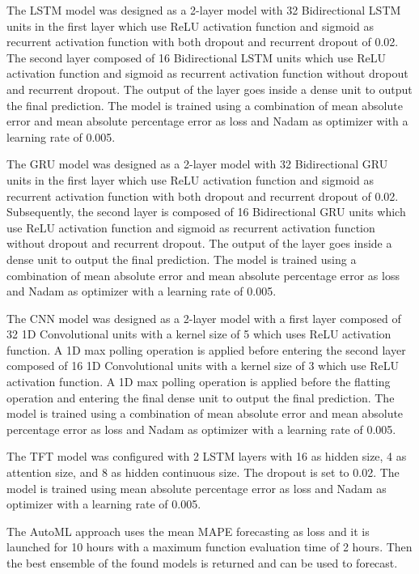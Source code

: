 The LSTM model was designed as a 2-layer model with 32 Bidirectional LSTM units in the first layer which use ReLU activation function and sigmoid as recurrent activation function with both dropout and recurrent dropout of 0.02.
The second layer composed of 16 Bidirectional LSTM units which use ReLU activation function and sigmoid as recurrent activation function without dropout and recurrent dropout.
The output of the layer goes inside a dense unit to output the final prediction.
The model is trained using a combination of mean absolute error and mean absolute percentage error as loss and Nadam as optimizer with a learning rate of 0.005.

The GRU model was designed as a 2-layer model with 32 Bidirectional GRU units in the first layer which use ReLU activation function and sigmoid as recurrent activation function with both dropout and recurrent dropout of 0.02.
Subsequently, the second layer is composed of 16 Bidirectional GRU units which use ReLU activation function and sigmoid as recurrent activation function without dropout and recurrent dropout.
The output of the layer goes inside a dense unit to output the final prediction.
The model is trained using a combination of mean absolute error and mean absolute percentage error as loss and Nadam as optimizer with a learning rate of 0.005.

The CNN model was designed as a 2-layer model with a first layer composed of 32 1D Convolutional units with a kernel size of 5 which uses ReLU activation function.
A 1D max polling operation is applied before entering the second layer composed of 16 1D Convolutional units with a kernel size of 3 which use ReLU activation function.
A 1D max polling operation is applied before the flatting operation and entering the final dense unit to output the final prediction.
The model is trained using a combination of mean absolute error and mean absolute percentage error as loss and Nadam as optimizer with a learning rate of 0.005.

The TFT model was configured with 2 LSTM layers with 16 as hidden size, 4 as attention size, and 8 as hidden continuous size.
The dropout is set to 0.02.
The model is trained using mean absolute percentage error as loss and Nadam as optimizer with a learning rate of 0.005.

The AutoML approach uses the mean MAPE forecasting as loss and it is launched for 10 hours with a maximum function evaluation time of 2 hours.
Then the best ensemble of the found models is returned and can be used to forecast.


